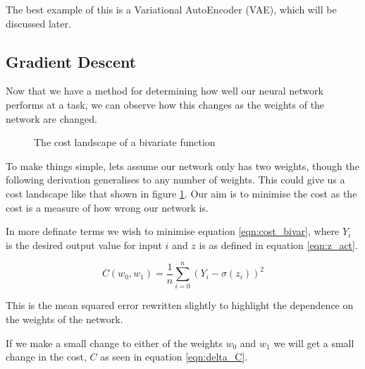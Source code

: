 The best example of this is a Variational AutoEncoder (VAE), which will be discussed later.


\subsection{Gradient Descent}
Now that we have a method for determining how well our neural network performs at a task, we can observe how this changes as the weights of the network are changed.


\begin{figure}
\begin{center}
\caption{The cost landscape of a bivariate function}
\label{fig:costscape}
\end{center}
\end{figure}

To make things simple, lets assume our network only has two weights, though the following derivation generalises to any number of weights. This could give us a cost landscape like that shown in figure \ref{fig:costscape}. Our aim is to minimise the cost as the cost is a measure of how wrong our network is.

In more definate terms we wish to minimise equation \ref{eqn:cost_bivar}, where $Y_i$ is the desired output value for input $i$ and $z$ is as defined in equation \ref{eqn:z_act}.

\begin{equation}
C(w_0, w_1) = \frac{1}{n}\sum_{i=0}^{n} (Y_i - \sigma(z_i))^2
\label{eqn:cost_bivar}
\end{equation}

This is the mean squared error rewritten slightly to highlight the dependence on the weights of the network.

If we make a small change to either of the weights $w_0$ and $w_1$ we will get a small change in the cost, $C$ as seen in equation \ref{eqn:delta_C}.

